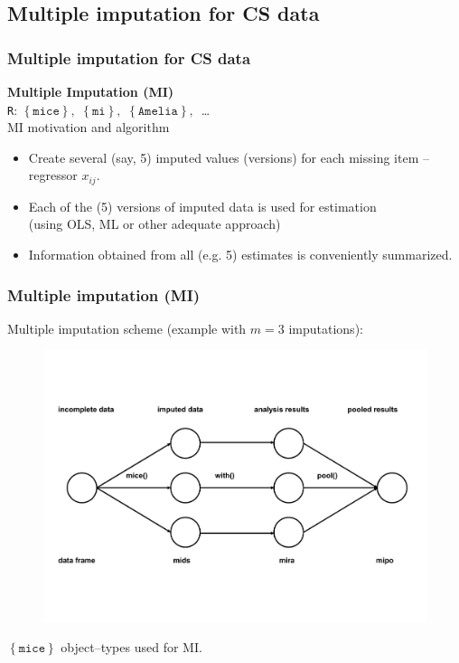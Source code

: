 \documentclass{beamer}
\begin{document}
\subsection{Multiple imputation for CS data}
\begin{frame}
\frametitle{Multiple imputation  for CS data}
\textbf{Multiple Imputation (MI) }\\
\texttt{R}: $\left\lbrace \texttt{mice}  \right\rbrace , \,\, \left\lbrace \texttt{mi}  \right\rbrace, \,\, \left\lbrace \texttt{Amelia}  \right\rbrace, \, $ \dots\\
  \vspace{0.5cm}
MI motivation and algorithm\\
  \vspace{0.2cm}
  \begin{itemize}
  \item Create several (say, 5) imputed values (versions) for each missing item -- regressor $x_{ij}$.
  \medskip
  \item Each of the (5) versions of imputed data is used for estimation \\(using OLS, ML or other adequate approach)
  \medskip
  \item Information obtained from all (e.g. 5) estimates is conveniently summarized.
 \end{itemize}
 \end{frame}
\begin{frame}
\frametitle{Multiple imputation (MI)}
Multiple imputation scheme (example with $m=3$ imputations):\\
\vspace{-1cm}
\begin{figure}
\includegraphics[width=1\linewidth]{IMG/mice_scheme.pdf}
\end{figure}
\centering
\vspace{-2.2cm}
$\left\lbrace \texttt{mice}  \right\rbrace$ object--types used for MI.
 \end{frame}
\end{document}
